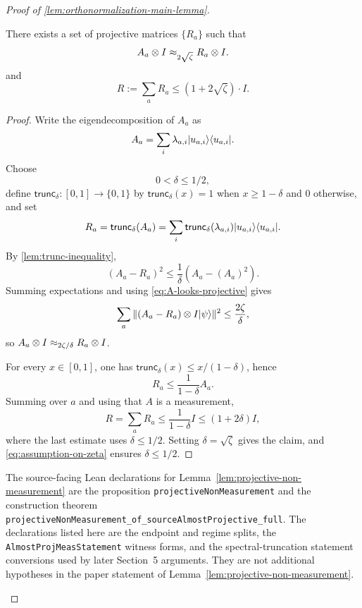 \begin{proof}[Proof of \ref{lem:orthonormalization-main-lemma}]
	\begin{lemma}\label{lem:projective-non-measurement}
		\leanok
		There exists a set of projective matrices $\{R_a\}$ such that
		\begin{equation*}
			A_a \otimes I \approx_{2\sqrt{\zeta}} R_a \otimes I.
		\end{equation*}
		and
		\begin{equation*}
			R:= \sum_a R_a \leq (1+2\sqrt{\zeta}) \cdot I.
		\end{equation*}
	\end{lemma}
	\begin{proof}
		\leanok
		Write the eigendecomposition of $A_a$ as
		\[
			A_a = \sum_i \lambda_{a,i}\lvert u_{a,i} \rangle\langle u_{a,i} \rvert.
		\]
		Choose
		\begin{equation}\label{eq:bound-on-delta}
			0 < \delta \leq 1/2,
		\end{equation}
		define $\mathsf{trunc}_\delta:[0,1] \to \{0,1\}$ by $\mathsf{trunc}_\delta(x)=1$ when $x \geq 1-\delta$ and $0$ otherwise, and set
		\[
			R_a = \mathsf{trunc}_\delta(A_a)
			=
			\sum_i \mathsf{trunc}_\delta(\lambda_{a,i}) \lvert u_{a,i} \rangle\langle u_{a,i} \rvert.
		\]
		By \ref{lem:trunc-inequality},
		\[
			(A_a-R_a)^2
			\leq
			\frac{1}{\delta}(A_a-(A_a)^2).
		\]
		Summing expectations and using \ref{eq:A-looks-projective} gives
		\[
			\sum_a \Vert (A_a-R_a)\otimes I \lvert \psi \rangle\Vert^2
			\leq
			\frac{2\zeta}{\delta},
		\]
		so $A_a \otimes I \approx_{2\zeta/\delta} R_a \otimes I$.

		For every $x \in [0,1]$, one has $\mathsf{trunc}_\delta(x) \leq x/(1-\delta)$, hence
		\[
			R_a \leq \frac{1}{1-\delta} A_a.
		\]
		Summing over $a$ and using that $A$ is a measurement,
		\[
			R = \sum_a R_a \leq \frac{1}{1-\delta} I \leq (1+2\delta)I,
		\]
		where the last estimate uses $\delta \leq 1/2$. Setting $\delta=\sqrt{\zeta}$ gives the claim, and \ref{eq:assumption-on-zeta} ensures $\delta \leq 1/2$.
	\end{proof}

	\begin{remark}\label{rem:lean-projective-non-measurement-auxiliary}
		The source-facing Lean declarations for
		Lemma~\ref{lem:projective-non-measurement} are the proposition
		\texttt{projectiveNonMeasurement} and the construction theorem
		\texttt{projectiveNonMeasurement\_of\_sourceAlmostProjective\_full}.
		The declarations listed here are the endpoint and regime splits, the
		\texttt{AlmostProjMeasStatement} witness forms, and the spectral-truncation
		statement conversions used by later Section~5 arguments.  They are not additional
		hypotheses in the paper statement of
		Lemma~\ref{lem:projective-non-measurement}.
	\end{remark}


\end{proof}
